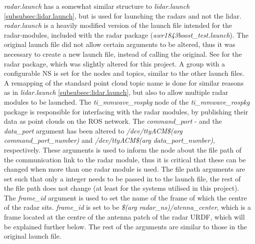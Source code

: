 \label{subsubsec:radar.launch}
\textit{radar.launch} has a somewhat similar structure to \textit{lidar.launch} \ref{subsubsec:lidar.launch}, but is used for launching the radars and not the lidar. \textit{radar.launch} is a heavily modified version of the launch file intended for the radar-modules, included with the radar package (\textit{awr1843boost\_test.launch}). The original launch file did not allow certain arguments to be altered, thus it was necessary to create a new launch file, instead of calling the original. See \cite{ti-mmwave-rospkg} for the radar package, which was slightly altered for this project. A group with a configurable NS is set for the nodes and topics, similar to the other launch files. A remapping of the standard point cloud topic name is done for similar reasons as in \textit{lidar.launch} \ref{subsubsec:lidar.launch}, but also to allow multiple radar modules to be launched. The \textit{ti\_mmwave\_rospkg} node of the \textit{ti\_mmwave\_rospkg} package is responsible for interfacing with the radar modules, by publishing their data as point clouds on the ROS network. The \textit{command\_port} - and the \textit{data\_port} argument has been altered to \textit{/dev/ttyACM\$(arg command\_port\_number)} and \textit{/dev/ttyACM\$(arg data\_port\_number)}, respectively. These arguments is used to inform the node about the file path of the communication link to the radar module, thus it is critical that these can be changed when more than one radar module is used. The file path arguments are set such that only a integer needs to be passed in to the launch file, the rest of the file path does not change (at least for the systems utilised in this project). The \textit{frame\_id} argument is used to set the name of the frame of which the centre of the radar sits. \textit{frame\_id} is set to be \textit{\$(arg radar\_ns)/atenna\_center}, which is a frame located at the centre of the antenna patch of the radar URDF, which will be explained further below. The rest of the arguments are similar to those in the original launch file. 

